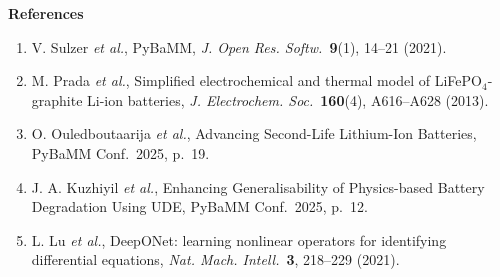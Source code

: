 \documentclass[12pt,a4paper]{article}
\begin{document}
\vspace{0.2em}
{\footnotesize
\textbf{References}
\begin{enumerate}[leftmargin=1.6em,itemsep=-0.35em,topsep=0.0em,labelsep=0.4em,parsep=0pt]
\item V. Sulzer \emph{et al.}, PyBaMM, \emph{J. Open Res. Softw.}\ \textbf{9}(1), 14--21 (2021).
\item M. Prada \emph{et al.}, Simplified electrochemical and thermal model of LiFePO$_4$-graphite Li-ion batteries, \emph{J. Electrochem. Soc.}\ \textbf{160}(4), A616--A628 (2013).
\item O. Ouledboutaarija \emph{et al.}, Advancing Second-Life Lithium-Ion Batteries, PyBaMM Conf.\ 2025, p.\ 19.
\item J. A. Kuzhiyil \emph{et al.}, Enhancing Generalisability of Physics-based Battery Degradation Using UDE, PyBaMM Conf.\ 2025, p.\ 12.
\item L. Lu \emph{et al.}, DeepONet: learning nonlinear operators for identifying differential equations, \emph{Nat. Mach. Intell.}\ \textbf{3}, 218--229 (2021).
\end{enumerate}
\par}
\end{document}
